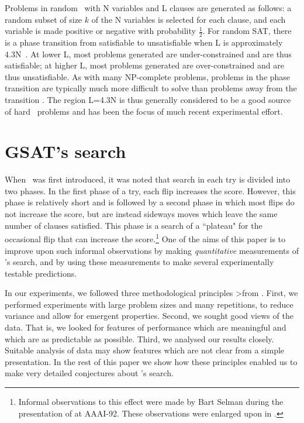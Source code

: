 Problems in random \kSAT\ with N variables and L clauses are generated
as follows: a random subset of size $k$ of the N variables
is selected for each clause, and each variable is made positive or negative
with probability $\frac{1}{2}$. 
For random \3SAT, there is a phase transition from satisfiable to
unsatisfiable when L is approximately 
4.3N~\cite{mitchell-hard-easy,larrabee-tsuji,crawford-auton}.
At lower L, most problems generated are under-constrained
and are thus satisfiable; at higher L, most problems generated are 
over-constrained and are thus unsatisfiable.
As with many NP-complete problems, problems in the phase transition
are typically much more difficult to solve 
than problems away from the transition \cite{cheeseman-hard}. 
The region L=4.3N is thus generally 
considered to be a good source of hard \SAT\ problems
and has been the focus of much recent experimental effort.


\section{GSAT's search}
\label{sec-graphs}

When \GSAT\ was first introduced, it was noted that
search in each try is divided into two phases.  In the first
phase of a try, each flip increases the score.  However, this phase is
relatively short and is followed by a second phase in which most flips do not
increase the score, but are instead sideways 
moves which leave the same number of
clauses satisfied. This phase is a search of a
``plateau" for the occasional flip that can increase the 
score.\footnote{Informal observations to this effect were
made by Bart Selman during the presentation of \cite{selman-gsat} at AAAI-92.
These observations were enlarged upon in \cite{rp605}.} 
One of the aims of this paper is to improve upon such informal observations
by making {\em quantitative} measurements of \GSAT's search,
and by using these measurements to make several
experimentally testable predictions.

In our experiments, we followed three methodological principles
>from \cite{mcgeoch1}.
First, we performed experiments with large problem sizes and 
many repetitions, to reduce variance and allow for emergent properties.
Second, we sought good views of the data.
That is, we looked for
features of performance which are meaningful
and which are as predictable as possible.
Third, we analysed our results closely.
Suitable analysis of data may show features which
are not clear from a simple presentation.  
In the rest of this paper we show how these
principles enabled us to make very detailed conjectures
about \GSAT's search. 

